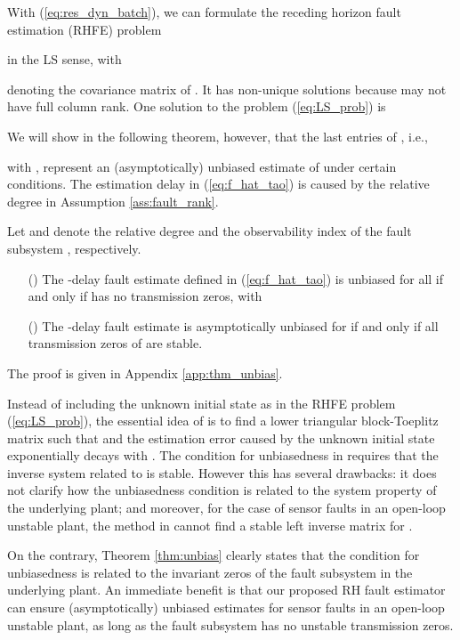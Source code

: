 \documentclass[twocolumn]{autart}
\begin{document}
With (\ref{eq:res_dyn_batch}), we can formulate the receding horizon fault estimation (RHFE) problem

in the LS sense, with

denoting the covariance matrix of .
It has non-unique solutions because  may not have full column rank. One solution to the problem (\ref{eq:LS_prob}) is

We will show in the following theorem, however, that the last  entries of , i.e.,

with , 
represent an (asymptotically) unbiased estimate of  under certain conditions. The estimation delay  in (\ref{eq:f_hat_tao}) is caused by the relative degree in Assumption \ref{ass:fault_rank}.


\begin{thm}\label{thm:unbias}
Let  and  denote the relative degree and the observability index of the fault subsystem , respectively.
\begin{enumerate}
  \item[(\romannumeral1)] The -delay fault estimate  defined in (\ref{eq:f_hat_tao}) is unbiased for all  if and only if  has no transmission zeros, with 

  \item[(\romannumeral2)] The -delay fault estimate  is asymptotically unbiased for  if and only if all transmission zeros of  are stable.
\end{enumerate}
\end{thm}

The proof is given in Appendix \ref{app:thm_unbias}.

Instead of including the unknown initial state as in the RHFE problem (\ref{eq:LS_prob}), the essential idea of \cite{Dong2012c} is to find a lower triangular block-Toeplitz matrix  such that  and the estimation error caused by the unknown initial state exponentially decays with . The condition for unbiasedness in \cite{Dong2012c} requires that the inverse system related to  is stable. However this has several drawbacks: it does not clarify how the unbiasedness condition is related to the system property of the underlying plant; and moreover, for the case of sensor faults in an open-loop unstable plant, the method in \cite{Dong2012c} cannot find a stable left inverse matrix  for .

On the contrary, Theorem \ref{thm:unbias} clearly states that the condition for unbiasedness is related to the invariant zeros of the fault subsystem in the underlying plant. An immediate benefit is that our proposed RH fault estimator can ensure (asymptotically) unbiased estimates for sensor faults in an open-loop unstable plant, as long as the fault subsystem has no unstable transmission zeros.
\end{document}
